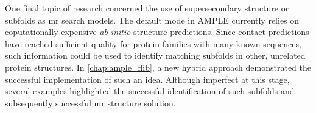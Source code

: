 One final topic of research concerned the use of supersecondary structure or subfolds as \gls{mr} search models. The default mode in AMPLE currently relies on coputationally expensive \textit{ab initio} structure predictions. Since contact predictions have reached sufficient quality for protein families with many known sequences, such information could be used to identify matching subfolds in other, unrelated protein structures. In \cref{chap:ample_flib}, a new hybrid approach demonstrated the successful implementation of such an idea. Although imperfect at this stage, several examples highlighted the successful identification of such subfolds and subsequently successful \gls{mr} structure solution.

